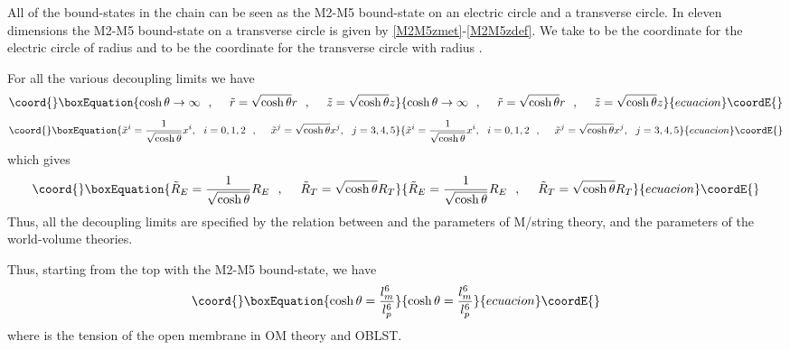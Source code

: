 \documentclass[a4paper,twoside,titlepage,12pt]{article}
\begin{document}
All of the bound-states in the chain can be seen as the M2-M5 bound-state
on an electric circle and a transverse circle. 
In eleven dimensions the M2-M5 bound-state on a transverse
circle is given by \eqref{M2M5zmet}-\eqref{M2M5zdef}.
We take \coordHE{} to be the coordinate for the electric circle of 
radius \coordHE{} and \coordHE{} to be the coordinate for the transverse circle
with radius \coordHE{}.

For all the various decoupling limits we have
%
\begin{equation}\coord{}\boxEquation{
\label{Alllim1}
\cosh \theta \rightarrow \infty \spa
\tilde{r} = \sqrt{\cosh \theta} r \spa
\tilde{z} = \sqrt{\cosh \theta} z 
}{
\cosh \theta \rightarrow \infty \spa
\tilde{r} = \sqrt{\cosh \theta} r \spa
\tilde{z} = \sqrt{\cosh \theta} z 
}{ecuacion}\coordE{}\end{equation}
%
\begin{equation}\coord{}\boxEquation{
\label{Alllim2}
\tilde{x}^i = \frac{1}{\sqrt{\cosh \theta}} x^i, \ \ i=0,1,2 \spa
\tilde{x}^j = \sqrt{\cosh \theta} x^j,\ \ j=3,4,5 
}{
\tilde{x}^i = \frac{1}{\sqrt{\cosh \theta}} x^i, \ \ i=0,1,2 \spa
\tilde{x}^j = \sqrt{\cosh \theta} x^j,\ \ j=3,4,5 
}{ecuacion}\coordE{}\end{equation}
%
which gives
%
\begin{equation}\coord{}\boxEquation{
\tilde{R}_E = \frac{1}{\sqrt{\cosh \theta}} R_E \spa
\tilde{R}_T = \sqrt{\cosh \theta} R_T 
}{
\tilde{R}_E = \frac{1}{\sqrt{\cosh \theta}} R_E \spa
\tilde{R}_T = \sqrt{\cosh \theta} R_T 
}{ecuacion}\coordE{}\end{equation}
%
Thus, all the decoupling limits are specified by the relation between
\myHighlight{\( \cosh \theta \)}\coordHE{} and the parameters of M/string theory, and
the parameters of the world-volume theories.

Thus, starting from the top with the M2-M5 bound-state, we have
%
\begin{equation}\coord{}\boxEquation{
\cosh \theta = \frac{\lm^6}{l_p^6}
}{
\cosh \theta = \frac{\lm^6}{l_p^6}
}{ecuacion}\coordE{}\end{equation}
%
where \coordHE{} is the tension of the open membrane in OM theory
and \coordHE{} OBLST.
\end{document}
